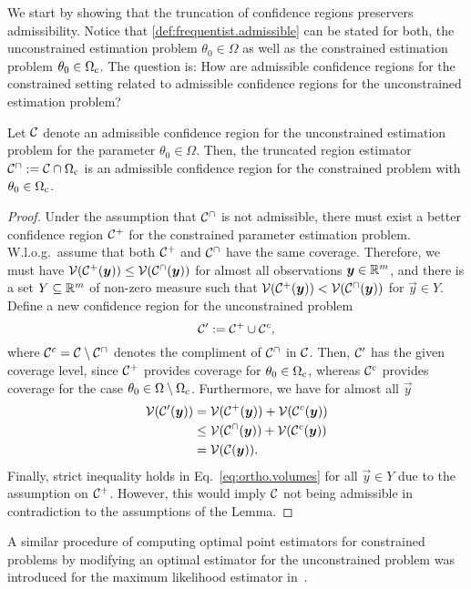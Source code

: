 We start by showing that the truncation of confidence regions preservers admissibility.
Notice that \cref{def:frequentist.admissible} can be stated for both, the unconstrained estimation problem $\theta_0 \in \Omega$ as well as the constrained estimation problem $\theta_0 \in \Omega_{\mathrm{c}}$.
The question is: How are admissible confidence regions for the constrained setting related to admissible confidence regions for the unconstrained estimation problem?
\begin{lemma}\label{lem:ortho.admissible_truncation}
  Let $\mathcal{C}$ denote an admissible confidence region for the unconstrained estimation problem for the parameter $\theta_0 \in \Omega$.
  Then, the truncated region estimator $\mathcal{C}^\cap := \mathcal{C}\cap\Omega_{\mathrm{c}}$ is an admissible confidence region for the constrained problem with $\theta_0 \in \Omega_{\mathrm{c}}$.
\end{lemma}
\begin{proof}
  Under the assumption that $\mathcal{C}^\cap$ is not admissible, there must exist a better confidence region $\mathcal{C}^+$ for the constrained parameter estimation problem.
  W.l.o.g.\ assume that both $\mathcal{C}^+$ and $\mathcal{C}^\cap$ have the same coverage.
  Therefore, we must have $\mathcal{V}(\mathcal{C}^+(\boldsymbol{y})) \leq \mathcal{V}(\mathcal{C}^\cap(\boldsymbol{y}))$ for almost all observations $\boldsymbol{y} \in \mathbb{R}^m$, and there is a set $Y \subseteq \mathbb{R}^m$ of non-zero measure such that $\mathcal{V}(\mathcal{C}^+(\boldsymbol{y})) < \mathcal{V}(\mathcal{C}^\cap(\boldsymbol{y}))$ for $\vec y \in Y$.
  Define a new confidence region for the unconstrained problem
  \[
    \mathcal{C}' := \mathcal{C}^+ \cup \mathcal{C}^c,
    \label{eq:ortho.new_region}
  \]
  where $\mathcal{C}^{c}=\mathcal{C}\setminus \mathcal{C}^{\cap}$ denotes the compliment of $\mathcal{C}^{\cap}$ in $\mathcal{C}$.
  Then, $\mathcal{C}'$ has the given coverage level, since $\mathcal{C}^+$ provides coverage for $\theta_0 \in \Omega_{\mathrm{c}}$, whereas $\mathcal{C}^c$ provides coverage for the case $\theta_0 \in \Omega \setminus \Omega_{\mathrm{c}}$.
  Furthermore, we have for almost all $\vec y$
  \[
    \label{eq:ortho.volumes}
    \begin{split}
      \mathcal{V}(\mathcal{C}'(\boldsymbol{y}))
      &= \mathcal{V}(\mathcal{C}^+(\boldsymbol{y})) + \mathcal{V}(\mathcal{C}^c(\boldsymbol{y})) \\
      &\leq \mathcal{V}(\mathcal{C}^\cap(\boldsymbol{y})) + \mathcal{V}(\mathcal{C}^c(\boldsymbol{y})) \\
      &= \mathcal{V}(\mathcal{C}(\boldsymbol{y})).
    \end{split}
  \]
  Finally, strict inequality holds in Eq.~\eqref{eq:ortho.volumes} for all $\vec y \in Y$ due to the assumption on $\mathcal{C}^+$.
  However, this would imply $\mathcal{C}$ not being admissible in contradiction to the assumptions of the Lemma.
\end{proof}
A similar procedure of computing optimal point estimators for constrained problems by modifying an optimal estimator for the unconstrained problem was introduced for the maximum likelihood estimator in~\cite{Smolin_2012_Maximum}.\\



